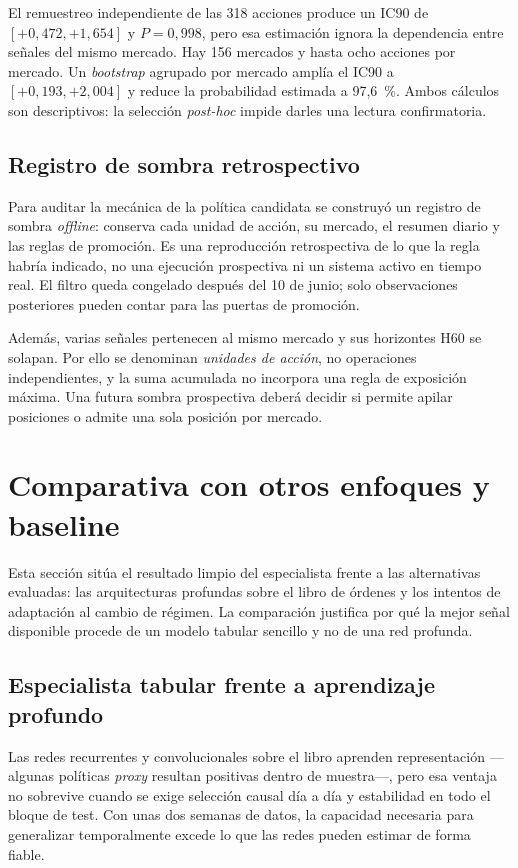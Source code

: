 El remuestreo independiente de las 318 acciones produce un IC90 de
$[+0{,}472,+1{,}654]$ y $P=0{,}998$, pero esa estimación ignora la dependencia entre señales
del mismo mercado. Hay 156 mercados y hasta ocho acciones por mercado. Un \emph{bootstrap}
agrupado por mercado amplía el IC90 a $[+0{,}193,+2{,}004]$ y reduce la probabilidad estimada
a 97,6~\%. Ambos cálculos son descriptivos: la selección \emph{post-hoc} impide darles una
lectura confirmatoria.

\subsection{Registro de sombra retrospectivo}

Para auditar la mecánica de la política candidata se construyó un registro de sombra
\emph{offline}: conserva cada unidad de acción, su mercado, el resumen diario y las reglas de
promoción. Es una reproducción retrospectiva de lo que la regla habría indicado, no una
ejecución prospectiva ni un sistema activo en tiempo real. El filtro queda congelado después
del 10 de junio; solo observaciones posteriores pueden contar para las puertas de promoción.

Además, varias señales pertenecen al mismo mercado y sus horizontes H60 se solapan. Por ello
se denominan \emph{unidades de acción}, no operaciones independientes, y la suma acumulada no
incorpora una regla de exposición máxima. Una futura sombra prospectiva deberá decidir si
permite apilar posiciones o admite una sola posición por mercado.

\section{Comparativa con otros enfoques y baseline}

Esta sección sitúa el resultado limpio del especialista frente a las alternativas evaluadas:
las arquitecturas profundas sobre el libro de órdenes y los intentos de adaptación al cambio
de régimen. La comparación justifica por qué la mejor señal disponible procede de un modelo
tabular sencillo y no de una red profunda.

\subsection{Especialista tabular frente a aprendizaje profundo}

Las redes recurrentes y convolucionales sobre el libro aprenden representación ---algunas
políticas \emph{proxy} resultan positivas dentro de muestra---, pero esa ventaja no sobrevive
cuando se exige selección causal día a día y estabilidad en todo el bloque de test. Con unas
dos semanas de datos, la capacidad necesaria para generalizar temporalmente excede lo que
las redes pueden estimar de forma fiable.

